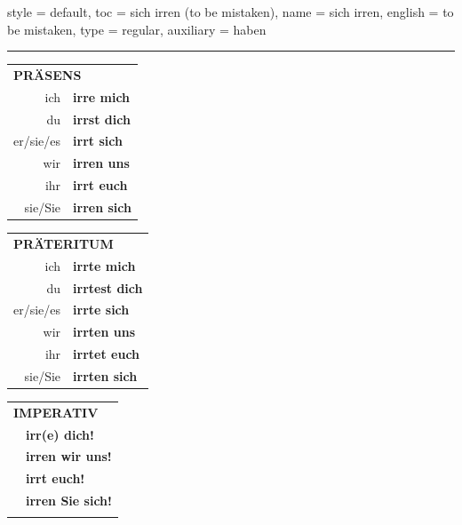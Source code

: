 \begin{verbentry}{
  style = {default},
  toc = {sich irren (to be mistaken)},
  name = {sich irren},
  english = {to be mistaken},
  type = {regular},
  auxiliary = {haben}
}
 
    
     \vspace{5pt}

    \hrule
    
    \vspace{5pt}

  \begin{tabular}{rl}
     \multicolumn{2}{l}{\textbf{PRÄSENS} }\\
    ich & \textbf{irre mich}\\
    du & \textbf{irrst dich}\\
    er/sie/es & \textbf{irrt sich}\\
    wir & \textbf{irren uns}\\
    ihr & \textbf{irrt euch}\\
    sie/Sie & \textbf{irren sich}\\
  \end{tabular}
  \hfill
     \begin{tabular}{rl}
    \multicolumn{2}{l}{\textbf{PRÄTERITUM} }\\
    ich & \textbf{irrte mich}\\
    du & \textbf{irrtest dich}\\
    er/sie/es & \textbf{irrte sich}\\
    wir & \textbf{irrten uns}\\
    ihr & \textbf{irrtet euch}\\
    sie/Sie & \textbf{irrten sich}\\
  \end{tabular}
  \hfill
  \begin{tabular}{rl}
     \multicolumn{2}{l}{\textbf{IMPERATIV} }\\
   & \textbf{irr(e) dich!}\\
   & \textbf{irren wir uns!}\\
   & \textbf{irrt euch!}\\
   & \textbf{irren Sie sich!}\\
   & \vspace{10pt}
  \end{tabular}

    \vspace{10pt}


\end{verbentry}
